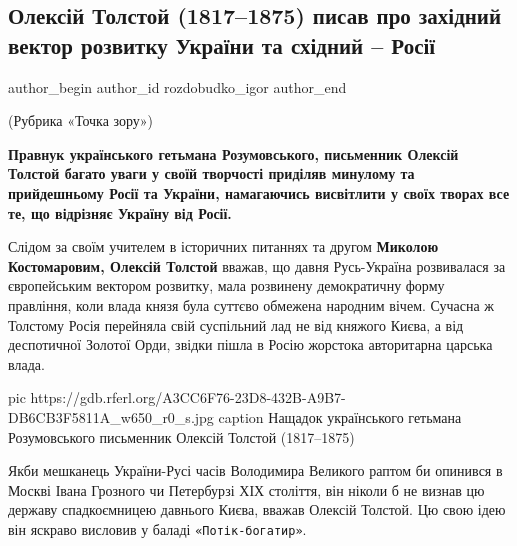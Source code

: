  
 
 
 
 
 
\subsection{Олексій Толстой (1817–1875) писав про західний вектор розвитку України та східний – Росії}
\label{sec:29_11_2020.news.ua.radio_svoboda.rozdobudko_igor.1.russia_oleksii_tolstoj}
\ifcmt
  author_begin
   author_id rozdobudko_igor
  author_end
\fi

(Рубрика «Точка зору»)

\begin{leftbar}
  \bfseries
Правнук українського гетьмана Розумовського, письменник Олексій Толстой багато
уваги у своїй творчості приділяв минулому та прийдешньому Росії та України,
намагаючись висвітлити у своїх творах все те, що відрізняє Україну від Росії.
\end{leftbar}

Слідом за своїм учителем в історичних питаннях та другом \textbf{Миколою Костомаровим,
Олексій Толстой} вважав, що давня Русь-Україна розвивалася за європейським
вектором розвитку, мала розвинену демократичну форму правління, коли влада
князя була суттєво обмежена народним вічем. Сучасна ж Толстому Росія перейняла
свій суспільний лад не від княжого Києва, а від деспотичної Золотої Орди,
звідки пішла в Росію жорстока авторитарна царська влада.

\ifcmt
pic https://gdb.rferl.org/A3CC6F76-23D8-432B-A9B7-DB6CB3F5811A_w650_r0_s.jpg
caption Нащадок українського гетьмана Розумовського письменник Олексій Толстой (1817–1875)
\fi

Якби мешканець України-Русі часів Володимира Великого раптом би опинився в
Москві Івана Грозного чи Петербурзі ХІХ століття, він ніколи б не визнав цю
державу спадкоємницею давнього Києва, вважав Олексій Толстой. Цю свою ідею він
яскраво висловив у баладі \verb|«Потік-богатир»|.

